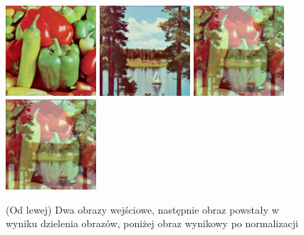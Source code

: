 \documentclass[final,a4paper,openany,12pt]{mwbk}
\begin{document}
\hfill
\\\\
\indent

\begin{figure}[H]
	\begin{center}
		\includegraphics[width=0.3\textwidth]{1/1Color_Div_Img1_Original}
		\includegraphics[width=0.3\textwidth]{1/1Color_Div_Img2_Original}
		\includegraphics[width=0.3\textwidth]{1/1Color_Div_Img_Result}
		\includegraphics[width=0.3\textwidth]{1/1Color_Div_Img_Result_Norm}
	\end{center}
	\caption{(Od lewej) Dwa obrazy wejściowe, następnie obraz powstały w wyniku dzielenia obrazów, poniżej obraz wynikowy po normalizacji }
\end{figure}
\end{document}
